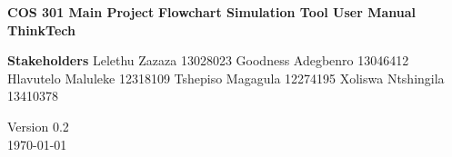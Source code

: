 \begin{titlepage}
	\begin{center}
		
		\begin{figure}[t]
			\centering
		\end{figure}		
	
	
	\begin{flushright} 
		
		\textbf{\LARGE COS 301 Main Project}
		\newline \newline \newline
		\textbf{\LARGE Flowchart Simulation Tool User Manual}
		\newline \newline \newline
 		\textbf{\LARGE ThinkTech}
		\newline \newline \newline
	\end{flushright}
	
	\begin{flushright} \large
			\textbf{\LARGE Stakeholders}\newline 
			Lelethu Zazaza 13028023\newline
			Goodness Adegbenro 13046412\newline
			Hlavutelo Maluleke 12318109\newline
			Tshepiso Magagula 12274195\newline
			Xoliswa Ntshingila 13410378\newline
	\end{flushright}
		
		\vspace{1 cm}
		

		
		\vfill
		
		{\LARGE Version 0.2}
		\\
		{\large \today}		
		
		
	\end{center}
\end{titlepage}

